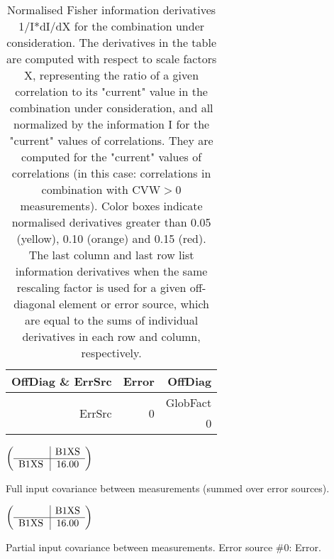 \begin{table}[H]
\scriptsize
\begin{center}
\renewcommand{\arraystretch}{1.1}
\begin{tabular}{|r|r|r|}
\hline
 OffDiag \& ErrSrc & {\tiny Error} & OffDiag\\
\hline
\hline
\multirow{2}{*}{ErrSrc} & \multirow{2}{*}{ 0} & GlobFact\\
 & &  0 \\
\hline
\end{tabular}
\renewcommand{\arraystretch}{1}
\caption{Normalised Fisher information derivatives 1/I*dI/dX for the combination under consideration. The derivatives in the table are computed with respect to scale factors X, representing the ratio of a given correlation to its "current" value in the combination under consideration, and all normalized by the information I for the "current" values of correlations. They are computed for the "current" values of correlations (in this case: correlations in combination with CVW$>$0 measurements). Color boxes indicate normalised derivatives greater than 0.05 (yellow), 0.10 (orange) and 0.15 (red). The last column and last row list information derivatives when the same rescaling factor is used for a given off-diagonal element or error source, which are equal to the sums of individual derivatives in each row and column, respectively.}
\end{center}
\end{table}
\begin{table}[H]
\scriptsize
\begin{center}
\renewcommand{\arraystretch}{1.1}
\begin{math}\left(\begin{array}{c|c}
 & \mathrm{B1XS} \\
\hline
\mathrm{B1XS} \hspace*{2pt} &      16.00 \\
\end{array}\right)\end{math}
\caption{Full input covariance between measurements (summed over error sources).}
\renewcommand{\arraystretch}{1}
\end{center}
\end{table}
\begin{table}[H]
\scriptsize
\begin{center}
\renewcommand{\arraystretch}{1.1}
\begin{math}\left(\begin{array}{c|c}
 & \mathrm{B1XS} \\
\hline
\mathrm{B1XS} \hspace*{2pt} &      16.00 \\
\end{array}\right)\end{math}
\caption{Partial input covariance between measurements. Error source \#0: Error.}
\renewcommand{\arraystretch}{1}
\end{center}
\end{table}
\clearpage
